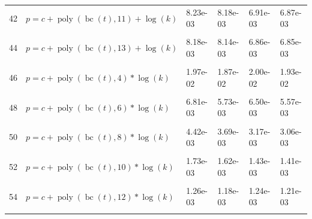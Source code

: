 \documentclass[12pt,a4paper]{article}
\DeclareMathOperator{\bc}{bc}
\DeclareMathOperator{\poly}{poly}
\begin{document}
\begin{longtable}[t]{ll>{\raggedleft\arraybackslash}p{2cm}>{\raggedleft\arraybackslash}p{2cm}>{\raggedleft\arraybackslash}p{2cm}>{\raggedleft\arraybackslash}p{2cm}}
42 & $p = c + \poly\left( \bc(t), 11 \right) + \log(k)$ & 8.23e-03 & 8.18e-03 & 6.91e-03 & 6.87e-03\\
\cellcolor{gray!6}{43} & \cellcolor{gray!6}{$p = c + \poly\left( \bc(t), 12 \right) + \log(k)$} & \cellcolor{gray!6}{8.22e-03} & \cellcolor{gray!6}{8.17e-03} & \cellcolor{gray!6}{6.89e-03} & \cellcolor{gray!6}{6.86e-03}\\
44 & $p = c + \poly\left( \bc(t), 13 \right) + \log(k)$ & 8.18e-03 & 8.14e-03 & 6.86e-03 & 6.85e-03\\
\cellcolor{gray!6}{45} & \cellcolor{gray!6}{$p = c + \poly\left( \bc(t), 3 \right) * \log(k)$} & \cellcolor{gray!6}{3.28e-02} & \cellcolor{gray!6}{1.99e-02} & \cellcolor{gray!6}{2.12e-02} & \cellcolor{gray!6}{1.97e-02}\\
46 & $p = c + \poly\left( \bc(t), 4 \right) * \log(k)$ & 1.97e-02 & 1.87e-02 & 2.00e-02 & 1.93e-02\\
\cellcolor{gray!6}{47} & \cellcolor{gray!6}{$p = c + \poly\left( \bc(t), 5 \right) * \log(k)$} & \cellcolor{gray!6}{1.66e-02} & \cellcolor{gray!6}{1.60e-02} & \cellcolor{gray!6}{1.36e-02} & \cellcolor{gray!6}{1.34e-02}\\
48 & $p = c + \poly\left( \bc(t), 6 \right) * \log(k)$ & 6.81e-03 & 5.73e-03 & 6.50e-03 & 5.57e-03\\
\cellcolor{gray!6}{49} & \cellcolor{gray!6}{$p = c + \poly\left( \bc(t), 7 \right) * \log(k)$} & \cellcolor{gray!6}{6.66e-03} & \cellcolor{gray!6}{5.42e-03} & \cellcolor{gray!6}{5.90e-03} & \cellcolor{gray!6}{5.17e-03}\\
50 & $p = c + \poly\left( \bc(t), 8 \right) * \log(k)$ & 4.42e-03 & 3.69e-03 & 3.17e-03 & 3.06e-03\\
\cellcolor{gray!6}{51} & \cellcolor{gray!6}{$p = c + \poly\left( \bc(t), 9 \right) * \log(k)$} & \cellcolor{gray!6}{2.74e-03} & \cellcolor{gray!6}{2.51e-03} & \cellcolor{gray!6}{2.75e-03} & \cellcolor{gray!6}{2.54e-03}\\
52 & $p = c + \poly\left( \bc(t), 10 \right) * \log(k)$ & 1.73e-03 & 1.62e-03 & 1.43e-03 & 1.41e-03\\
\cellcolor{gray!6}{53} & \cellcolor{gray!6}{$p = c + \poly\left( \bc(t), 11 \right) * \log(k)$} & \cellcolor{gray!6}{1.30e-03} & \cellcolor{gray!6}{1.22e-03} & \cellcolor{gray!6}{1.34e-03} & \cellcolor{gray!6}{1.27e-03}\\
54 & $p = c + \poly\left( \bc(t), 12 \right) * \log(k)$ & 1.26e-03 & 1.18e-03 & 1.24e-03 & 1.21e-03\\
\cellcolor{gray!6}{55} & \cellcolor{gray!6}{$p = c + \poly\left( \bc(t), 13 \right) * \log(k)$} & \cellcolor{gray!6}{1.01e-03} & \cellcolor{gray!6}{9.94e-04} & \cellcolor{gray!6}{1.08e-03} & \cellcolor{gray!6}{1.08e-03}\\

\end{longtable}
\end{document}
